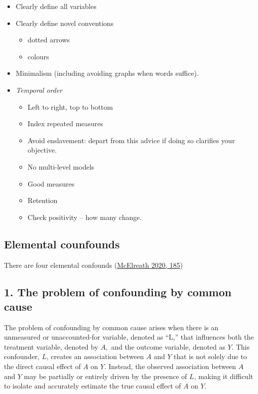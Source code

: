 \documentclass[
  singlecolumn]{report}
\providecommand{\tightlist}{%
  \setlength{\itemsep}{0pt}\setlength{\parskip}{0pt}}\usepackage{longtable,booktabs,array}
\begin{document}
\begin{itemize}
\tightlist
\item
  Clearly define all variables
\item
  Clearly define novel conventions

  \begin{itemize}
  \tightlist
  \item
    dotted arrows
  \item
    colours
  \end{itemize}
\item
  Minimalism (including avoiding graphs when words suffice).
\item
  \emph{Temporal order}

  \begin{itemize}
  \tightlist
  \item
    Left to right, top to bottom
  \item
    Index repeated measures
  \item
    Avoid enslavement: depart from this advice if doing so clarifies
    your objective.
  \item
    No multi-level models
  \item
    Good measures
  \item
    Retention
  \item
    Check positivity -- how many change.
  \end{itemize}
\end{itemize}

\hypertarget{elemental-counfounds}{%
\subsection{Elemental counfounds}\label{elemental-counfounds}}

There are four elemental confounds
(\protect\hyperlink{ref-mcelreath2020}{McElreath 2020, 185})

\hypertarget{the-problem-of-confounding-by-common-cause}{%
\subsection{1. The problem of confounding by common
cause}\label{the-problem-of-confounding-by-common-cause}}

The problem of confounding by common cause arises when there is an
unmeasured or unaccounted-for variable, denoted as ``L,'' that
influences both the treatment variable, denoted by \(A,\) and the
outcome variable, denoted as \(Y.\) This confounder, \(L\), creates an
association between \(A\) and \(Y\) that is not solely due to the direct
causal effect of \(A\) on \(Y\). Instead, the observed association
between \(A\) and \(Y\) may be partially or entirely driven by the
presence of \(L\), making it difficult to isolate and accurately
estimate the true causal effect of \(A\) on \(Y\).
\end{document}
